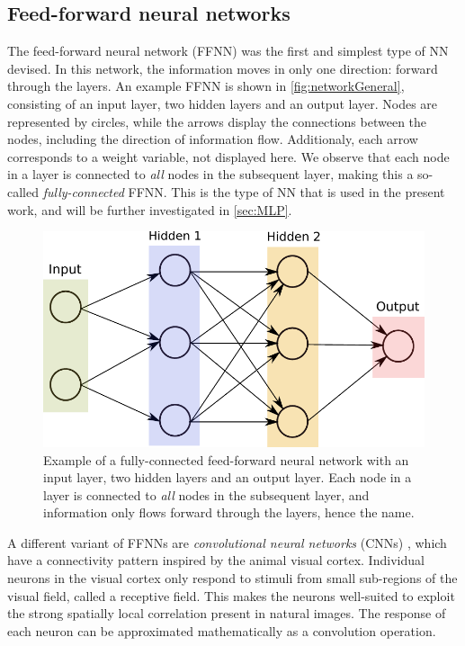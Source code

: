 \documentclass[twoside,english]{uiofysmaster}
\begin{document}
\subsection{Feed-forward neural networks}
The feed-forward neural network (FFNN) was the first and simplest type of NN devised. In this network, 
the information moves in only one direction: forward through the layers. An example FFNN is shown
in \autoref{fig:networkGeneral}, consisting of an input layer, two hidden layers and an output layer. 
Nodes are represented by circles, while the arrows display the connections between the nodes, including the 
direction of information flow. Additionaly, each arrow corresponds to a weight variable, not displayed here. 
We observe that each node in a layer is connected to \textit{all} nodes in the subsequent layer, 
making this a so-called \textit{fully-connected} FFNN. 
This is the type of NN that is used in the present work, 
and will be further investigated in \autoref{sec:MLP}.
\begin{figure}
 \centering
  \includegraphics[width=0.8\linewidth]{Figures/Theory/networkGeneral.pdf}
  \caption{Example of a fully-connected feed-forward neural network with an input layer, two hidden layers
	   and an output layer. Each node in a layer is connected to \textit{all} nodes in the subsequent layer, 
	   and information only flows forward through the layers, hence the name.}
  \label{fig:networkGeneral}
\end{figure}

A different variant of FFNNs are \textit{convolutional neural networks} (CNNs) \cite{LeCun99}, which have a connectivity pattern
inspired by the animal visual cortex. Individual neurons in the visual cortex only respond to stimuli from
small sub-regions of the visual field, called a receptive field. This makes the neurons well-suited to exploit the strong
spatially local correlation present in natural images. The response of each neuron can be approximated mathematically 
as a convolution operation. 
\end{document}
